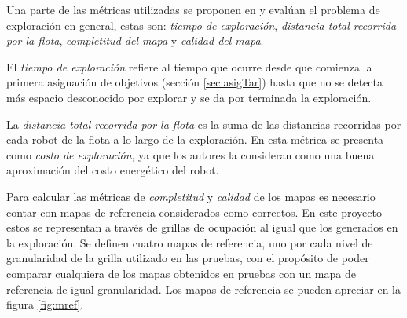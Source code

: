 Una parte de las métricas utilizadas se proponen en \cite{yan2015metrics} y
evalúan el problema de exploración en general, estas son: \emph{tiempo de
exploración}, \emph{distancia total recorrida por la flota}, \emph{completitud
del mapa} y \emph{calidad del mapa}. 

El \emph{tiempo de exploración} refiere al tiempo que ocurre desde que comienza la
primera asignación de objetivos (sección \ref{sec:asigTar}) hasta que no se
detecta más espacio desconocido por explorar y se da por terminada la
exploración.

La \emph{distancia total recorrida por la flota} es la suma de las distancias
recorridas por cada robot de la flota a lo largo de la exploración. En
\cite{yan2015metrics} esta métrica se presenta como \emph{costo de
exploración}, ya que los autores la consideran como una buena aproximación del
costo energético del robot. 


Para calcular las métricas de \emph{completitud} y \emph{calidad} de los mapas
es necesario contar con mapas de referencia considerados como correctos. En
este proyecto estos se representan a través de grillas de ocupación al igual
que los generados en la exploración. Se definen cuatro mapas de
referencia, uno por cada nivel de granularidad de la grilla utilizado en las pruebas, con el
propósito de poder comparar cualquiera de los mapas obtenidos en pruebas con
un mapa de referencia de igual granularidad. Los mapas de referencia se pueden
apreciar en la figura \ref{fig:mref}. 

